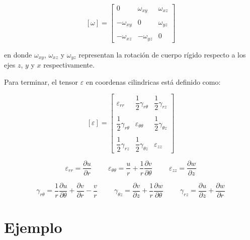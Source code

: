 \documentclass[../notas medios.tex]{subfiles}
\begin{document}
\[	
[\omega] =
\begin{bmatrix}
	0 & \omega_{xy}  &  \omega_{xz} \\\\
	 -\omega_{xy}  & 0 &  \omega_{yz} \\\\ 
	 -\omega_{xz}  & -\omega_{yz}  &  0
\end{bmatrix}\] 

en donde $\omega_{xy}$, $\omega_{xz}$ y  $\omega_{yz}$ representan la rotación de cuerpo rígido respecto a los ejes $z$, $y$ y $x$ respectivamente. 


Para terminar, el tensor $\varepsilon$ en coordenas cilindricas está definido como:  

\[	
[\varepsilon] =
\begin{bmatrix}
	\varepsilon_{rr} & \dfrac{1}{2} \gamma_{r\theta} & \dfrac{1}{2} \gamma_{rz}  \\\\
	\dfrac{1}{2} \gamma_{r\theta}  & \varepsilon_{{\theta}{\theta}} & \dfrac{1}{2}  \gamma_{{\theta}z}  \\\\
	 \dfrac{1}{2} \gamma_{rz} & \dfrac{1}{2} \gamma_{{\theta}z}  &  \varepsilon_{zz}
\end{bmatrix}\]


\begin{equation*}	
	\varepsilon_{rr} = \dfrac{\partial u}{\partial r}
	\hspace{1cm}
	\varepsilon_{\theta \theta} = \dfrac{u}{r} + \dfrac{1}{r} \dfrac{\partial v}{\partial \theta}
	\hspace{1cm}
	\varepsilon_{zz} = \dfrac{\partial w}{\partial z} 
\end{equation*}

\begin{equation*}	
	\gamma_{r \theta} = \dfrac{1}{r} \dfrac{\partial u}{\partial \theta} + \dfrac{\partial v}{\partial r} - \dfrac{v}{r} 
	\hspace{1cm}
	\gamma_{\theta z} = \dfrac{\partial v}{\partial z} + \dfrac{1}{r} \dfrac{\partial w}{\partial \theta} 
	\hspace{1cm}
	\gamma_{rz}	 = \dfrac{\partial u}{\partial z} + \dfrac{\partial w}{\partial r}
\end{equation*}

\section*{Ejemplo}
\end{document}
